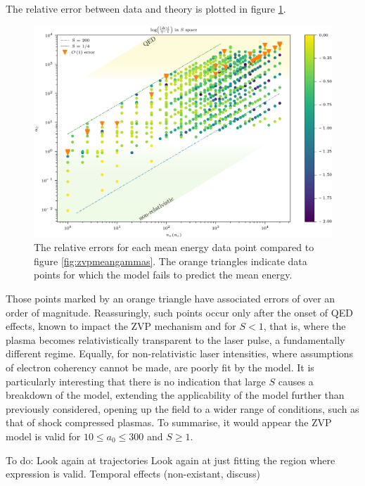 The relative error between data and theory is plotted in figure \ref{fig:zvp-logabserrortedit}. 
\begin{figure}
	\centering
	\includegraphics[width=1\linewidth]{figures/zvp/log_abs_error_T_edit}
	\caption[The relative errors for each mean energy data point compared to figure \ref{fig:zvpmeangammas}.]{The relative errors for each mean energy data point compared to figure \ref{fig:zvpmeangammas}. The orange triangles indicate data points for which the model fails to predict the mean energy.}
	\label{fig:zvp-logabserrortedit}
\end{figure}
Those points marked by an orange triangle have associated errors of over an order of magnitude. Reassuringly, such points occur only after the onset of QED effects, known to impact the ZVP mechanism \cite{savin_2019_EnergyAbsorptionLaserQED} and for $S<1$, that is, where the plasma becomes relativistically transparent to the laser pulse, a fundamentally different regime. Equally, for non-relativistic laser intensities, where assumptions of electron coherency cannot be made, are poorly fit by the model. It is particularly interesting that there is no indication that large $S$ causes a breakdown of the model, extending the applicability of the model further than previously considered, opening up the field to a wider range of conditions, such as that of shock compressed plasmas. To summarise, it would appear the ZVP model is valid for $10 \le a_0 \le 300$ and $S\ge1$.



To do:
Look again at trajectories
Look again at just fitting the region where expression is valid.
Temporal effects (non-existant, discuss)


